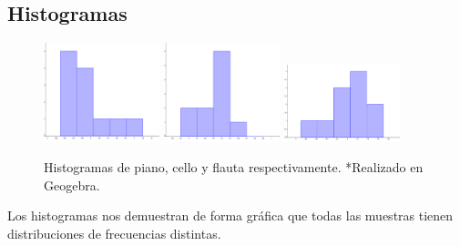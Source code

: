 \subsection{Histogramas}
\begin{center}
    \begin{figure}[H]
        \centering
        \includegraphics[width=0.3\textwidth]{./appendages/HP.png}
        \includegraphics[width=0.3\textwidth]{./appendages/HC.png}
        \includegraphics[width=0.3\textwidth]{./appendages/HF.png}
        \caption{Histogramas de piano, cello y flauta respectivamente. *Realizado en Geogebra.}
    \end{figure}
\end{center}
Los histogramas nos demuestran de forma gráfica que todas las muestras tienen distribuciones de frecuencias distintas.

